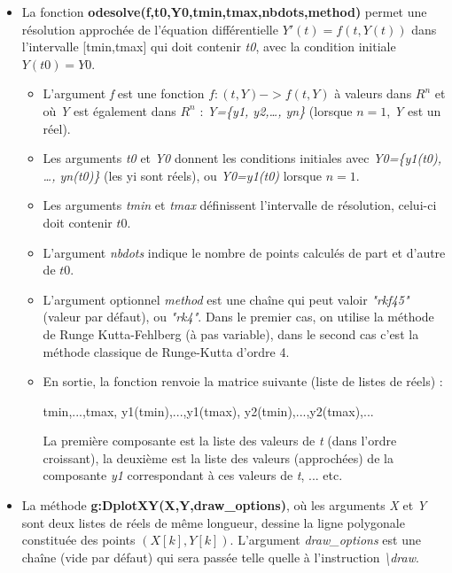 \begin{itemize}
\item La fonction \textbf{odesolve(f,t0,Y0,tmin,tmax,nbdots,method)} permet une résolution approchée de l'équation différentielle \(Y'(t)=f(t,Y(t))\) dans l'intervalle {[}tmin,tmax{]} qui doit contenir \emph{t0}, avec la condition initiale $Y(t0)=Y0$.

\begin{itemize}
  \item L'argument \emph{f} est une fonction \(f: (t,Y) -> f(t,Y)\) à valeurs dans \(R^n\) et où \emph{Y} est également dans \(R^n\) : \emph{Y=\{y1, y2,\ldots, yn\}} (lorsque $n=1$, \emph{Y} est un réel).
  \item Les arguments \emph{t0} et \emph{Y0} donnent les conditions initiales avec \emph{Y0=\{y1(t0), \ldots, yn(t0)\}} (les yi sont réels), ou \emph{Y0=y1(t0)} lorsque $n=1$.
  \item Les arguments \emph{tmin} et \emph{tmax} définissent l'intervalle de résolution, celui-ci doit contenir \(t0\).
  \item L'argument \emph{nbdots} indique le nombre de points calculés de part et d'autre de \(t0\).
  \item L'argument optionnel \emph{method} est une chaîne qui peut valoir \emph{"rkf45"} (valeur par défaut), ou \emph{"rk4"}. Dans le premier cas, on utilise la méthode de Runge Kutta-Fehlberg (à pas variable), dans le second cas c'est la méthode classique de Runge-Kutta d'ordre 4.
  \item En sortie, la fonction renvoie la matrice suivante (liste de listes de réels) :

\begin{TeXcode}
{ {tmin,...,tmax}, {y1(tmin),...,y1(tmax)}, {y2(tmin),...,y2(tmax)},...}
\end{TeXcode}

  La première composante est la liste des valeurs de \emph{t} (dans l'ordre croissant), la deuxième est la liste des valeurs (approchées) de la composante \emph{y1} correspondant à ces valeurs de \emph{t}, ... etc.
    \end{itemize}
    
\item La méthode \textbf{g:DplotXY(X,Y,draw\_options)}, où les arguments \emph{X} et \emph{Y} sont deux listes de réels de même longueur, dessine la ligne polygonale constituée des points $(X[k],Y[k])$. L'argument \emph{draw\_options} est une chaîne (vide par défaut) qui sera passée telle quelle à l'instruction \emph{\textbackslash draw}.


\end{itemize}
